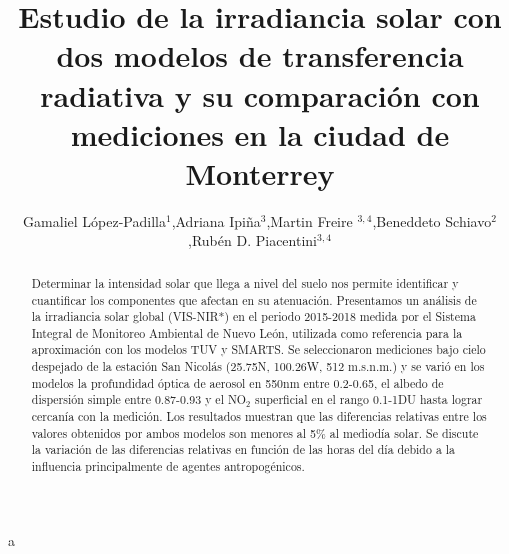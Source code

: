 \documentclass[reprint,amsmath,amssymb,aps,]{revtex4-1}
\begin{document}
\title{Estudio de la irradiancia solar con dos modelos de transferencia radiativa y su comparación con mediciones en la ciudad de Monterrey}
\author{Gamaliel López-Padilla$^1$,Adriana Ipiña$^3$,Martin Freire $^{3,4}$,Beneddeto Schiavo$^{2}$,Rubén D. Piacentini$^{3,4}$}
\begin{abstract}
Determinar la intensidad solar que llega a nivel del suelo nos permite identificar y cuantificar los componentes que afectan en su atenuación. Presentamos un análisis de la irradiancia solar global (VIS-NIR*) en el periodo 2015-2018 medida por el Sistema Integral de Monitoreo Ambiental de Nuevo León, utilizada como referencia para la aproximación con los modelos TUV y SMARTS. Se seleccionaron mediciones bajo cielo despejado de la estación San Nicolás (25.75N, 100.26W, 512 m.s.n.m.) y se varió en los modelos la profundidad óptica de aerosol en 550nm entre 0.2-0.65, el albedo de dispersión simple entre 0.87-0.93 y el NO$_2$ superficial en el rango 0.1-1DU hasta lograr cercanía con la medición. Los resultados muestran que las diferencias relativas entre los valores obtenidos por ambos modelos son menores al 5\% al mediodía solar. Se discute la variación de las diferencias relativas en función de las horas del día debido a la influencia principalmente de agentes antropogénicos.
\end{abstract}
\maketitle
a
\end{document}
